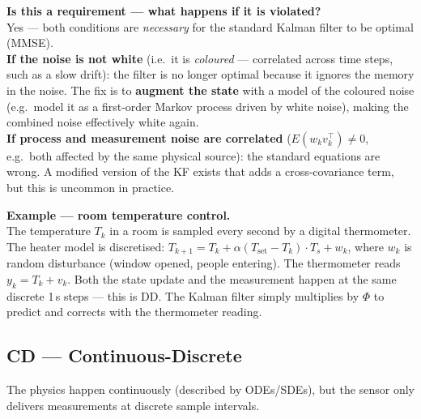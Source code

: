\documentclass[12pt, a4paper]{article}
\begin{document}
\begin{warnbox}
  \textbf{Is this a requirement --- what happens if it is violated?}\\
  Yes --- both conditions are \emph{necessary} for the standard
  Kalman filter to be optimal (MMSE).\\[4pt]
  \textbf{If the noise is not white} (i.e.\ it is \emph{coloured}
  --- correlated across time steps, such as a slow drift):
  the filter is no longer optimal because it ignores the memory in
  the noise.
  The fix is to \textbf{augment the state} with a model of the
  coloured noise (e.g.\ model it as a first-order Markov process
  driven by white noise), making the combined noise effectively
  white again.\\[4pt]
  \textbf{If process and measurement noise are correlated}
  ($E(w_k v_k^\top) \neq 0$, e.g.\ both affected by the same
  physical source): the standard equations are wrong.
  A modified version of the KF exists that adds a cross-covariance
  term, but this is uncommon in practice.
\end{warnbox}

\begin{notebox}
  \textbf{Example --- room temperature control.}\\
  The temperature $T_k$ in a room is sampled every second by a
  digital thermometer.
  The heater model is discretised: $T_{k+1} = T_k + \alpha(T_{\text{set}} - T_k)\cdot T_s + w_k$,
  where $w_k$ is random disturbance (window opened, people entering).
  The thermometer reads $y_k = T_k + v_k$.
  Both the state update and the measurement happen at the same
  discrete 1\,s steps --- this is DD.
  The Kalman filter simply multiplies by $\Phi$ to predict and
  corrects with the thermometer reading.
\end{notebox}
\clearpage
\subsection*{CD --- Continuous-Discrete}

The physics happen continuously (described by ODEs/SDEs), but the
sensor only delivers measurements at discrete sample intervals.
\end{document}
